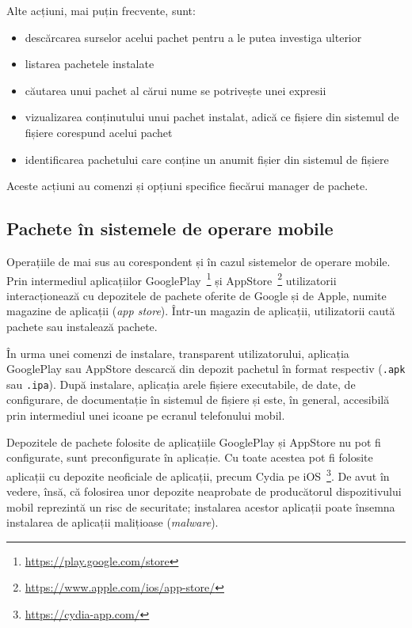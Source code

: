 Alte acțiuni, mai puțin frecvente, sunt:
\begin{itemize}
  \item descărcarea surselor acelui pachet pentru a le putea investiga ulterior
  \item listarea pachetele instalate
  \item căutarea unui pachet al cărui nume se potrivește unei expresii
  \item vizualizarea conținutului unui pachet instalat, adică ce fișiere din sistemul de fișiere corespund acelui pachet
  \item identificarea pachetului care conține un anumit fișier din sistemul de fișiere
\end{itemize}
Aceste acțiuni au comenzi și opțiuni specifice fiecărui manager de pachete.

\subsection{Pachete în sistemele de operare mobile}
\label{sec:package:mobile}

Operațiile de mai sus au corespondent și în cazul sistemelor de operare mobile. Prin intermediul aplicațiilor GooglePlay~\footnote{\url{https://play.google.com/store}} și AppStore~\footnote{\url{https://www.apple.com/ios/app-store/}} utilizatorii interacționează cu depozitele de pachete oferite de Google și de Apple, numite magazine de aplicații (\textit{app store}). Într-un magazin de aplicații, utilizatorii caută pachete sau instalează pachete.

În urma unei comenzi de instalare, transparent utilizatorului, aplicația GooglePlay sau AppStore descarcă din depozit pachetul în format respectiv (\texttt{.apk} sau \texttt{.ipa}). După instalare, aplicația arele fișiere executabile, de date, de configurare, de documentație în sistemul de fișiere și este, în general, accesibilă prin intermediul unei icoane pe ecranul telefonului mobil.

Depozitele de pachete folosite de aplicațiile GooglePlay și AppStore nu pot fi configurate, sunt preconfigurate în aplicație. Cu toate acestea pot fi folosite aplicații cu depozite neoficiale de aplicații, precum Cydia pe iOS~\footnote{\url{https://cydia-app.com/}}. De avut în vedere, însă, că folosirea unor depozite neaprobate de producătorul dispozitivului mobil reprezintă un risc de securitate; instalarea acestor aplicații poate însemna instalarea de aplicații malițioase (\textit{malware}).

